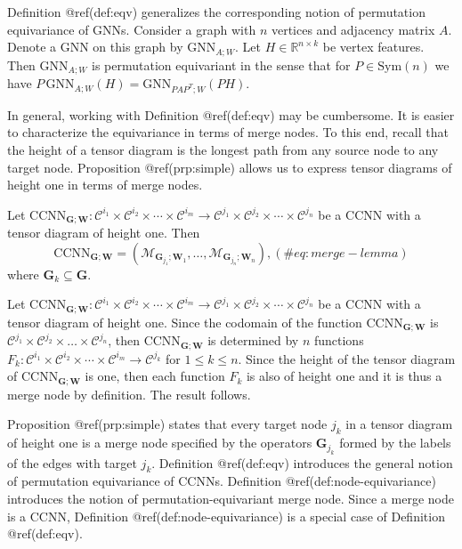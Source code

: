 \documentclass[
  12pt,
]{krantz}
\begin{document}
Definition @ref(def:eqv) generalizes the corresponding notion of
permutation equivariance of GNNs. Consider a graph with \(n\) vertices
and adjacency matrix \(A\). Denote a GNN on this graph by
\(\mathrm{GNN}_{A;W}\). Let \(H \in \mathbb{R}^{n \times k}\) be vertex
features. Then \(\mathrm{GNN}_{A;W}\) is permutation equivariant in the
sense that for \(P \in \mbox{Sym}(n)\) we have
\(P \,\mathrm{GNN}_{A;W}(H) = \mathrm{GNN}_{PAP^{T};W}(PH)\).

In general, working with Definition @ref(def:eqv) may be cumbersome. It
is easier to characterize the equivariance in terms of merge nodes. To
this end, recall that the height of a tensor diagram is the longest path
from any source node to any target node. Proposition @ref(prp:simple)
allows us to express tensor diagrams of height one in terms of merge
nodes.

\label{simple}
Let
\(\mbox{CCNN}_{\mathbf{G};\mathbf{W}}\colon \mathcal{C}^{i_1}\times\mathcal{C}^{i_2}\times \cdots \times  \mathcal{C}^{i_m} \to \mathcal{C}^{j_1}\times\mathcal{C}^{j_2}\times \cdots \times \mathcal{C}^{j_n}\)
be a CCNN with a tensor diagram of height one. Then \begin{equation}
        \label{merge_lemma}
        \mbox{CCNN}_{\mathbf{G};\mathbf{W}}=(
        \mathcal{M}_{\mathbf{G}_{j_1};\mathbf{W}_1},\ldots,
        \mathcal{M}_{\mathbf{G}_{j_n};\mathbf{W}_n}),
(\#eq:merge-lemma)
\end{equation} where \(\mathbf{G}_k \subseteq \mathbf{G}\).

Let
\(\mbox{CCNN}_{\mathbf{G};\mathbf{W}}\colon \mathcal{C}^{i_1}\times\mathcal{C}^{i_2}\times \cdots \times  \mathcal{C}^{i_m} \to \mathcal{C}^{j_1}\times\mathcal{C}^{j_2}\times \cdots \times \mathcal{C}^{j_n}\)
be a CCNN with a tensor diagram of height one. Since the codomain of the
function \(\mbox{CCNN}_{\mathbf{G};\mathbf{W}}\) is
\(\mathcal{C}^{j_1}\times\mathcal{C}^{j_2}\times \ldots \times \mathcal{C}^{j_n}\),
then \(\mbox{CCNN}_{\mathbf{G};\mathbf{W}}\) is determined by \(n\)
functions
\(F_k\colon  \mathcal{C}^{i_1}\times\mathcal{C}^{i_2}\times \cdots \times  \mathcal{C}^{i_m} \to \mathcal{C}^{j_k}\)
for \(1 \leq k \leq n\). Since the height of the tensor diagram of
\(\mbox{CCNN}_{\mathbf{G};\mathbf{W}}\) is one, then each function
\(F_k\) is also of height one and it is thus a merge node by definition.
The result follows.

Proposition @ref(prp:simple) states that every target node \(j_k\) in a
tensor diagram of height one is a merge node specified by the operators
\(\mathbf{G}_{j_k}\) formed by the labels of the edges with target
\(j_k\). Definition @ref(def:eqv) introduces the general notion of
permutation equivariance of CCNNs. Definition
@ref(def:node-equivariance) introduces the notion of
permutation-equivariant merge node. Since a merge node is a CCNN,
Definition @ref(def:node-equivariance) is a special case of Definition
@ref(def:eqv).
\end{document}
